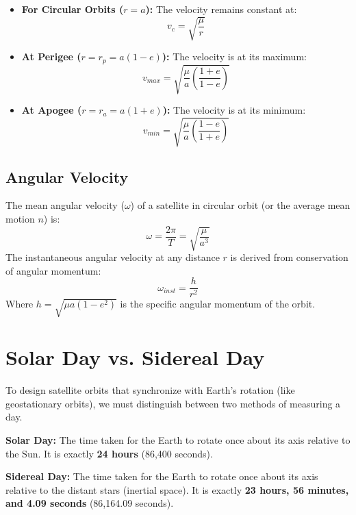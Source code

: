 \documentclass[12pt,a4paper]{article}
\begin{document}
\begin{itemize}[leftmargin=*, itemsep=6pt]
  \item \textbf{For Circular Orbits ($r = a$):} The velocity remains constant at:
    \begin{equation}
      v_{c} = \sqrt{\frac{\mu}{r}}
    \end{equation}
  \item \textbf{At Perigee ($r = r_p = a(1-e)$):} The velocity is at its maximum:
    \begin{equation}
      v_{max} = \sqrt{\frac{\mu}{a}\left(\frac{1+e}{1-e}\right)}
    \end{equation}
  \item \textbf{At Apogee ($r = r_a = a(1+e)$):} The velocity is at its minimum:
    \begin{equation}
      v_{min} = \sqrt{\frac{\mu}{a}\left(\frac{1-e}{1+e}\right)}
    \end{equation}
\end{itemize}

\subsection{Angular Velocity}
The mean angular velocity ($\omega$) of a satellite in circular orbit (or the average mean motion $n$) is:
\begin{equation}
  \omega = \frac{2\pi}{T} = \sqrt{\frac{\mu}{a^3}}
\end{equation}
The instantaneous angular velocity at any distance $r$ is derived from conservation of angular momentum:
\begin{equation}
  \omega_{inst} = \frac{h}{r^2}
\end{equation}
Where $h = \sqrt{\mu a(1 - e^2)}$ is the specific angular momentum of the orbit.

\section{Solar Day vs. Sidereal Day}

To design satellite orbits that synchronize with Earth's rotation (like geostationary orbits), we must distinguish between two methods of measuring a day.

\begin{tcolorbox}[defbox]
\textbf{Solar Day:} The time taken for the Earth to rotate once about its axis relative to the Sun. It is exactly \textbf{24 hours} (86,400 seconds).

\textbf{Sidereal Day:} The time taken for the Earth to rotate once about its axis relative to the distant stars (inertial space). It is exactly \textbf{23 hours, 56 minutes, and 4.09 seconds} (86,164.09 seconds).
\end{tcolorbox}
\end{document}
